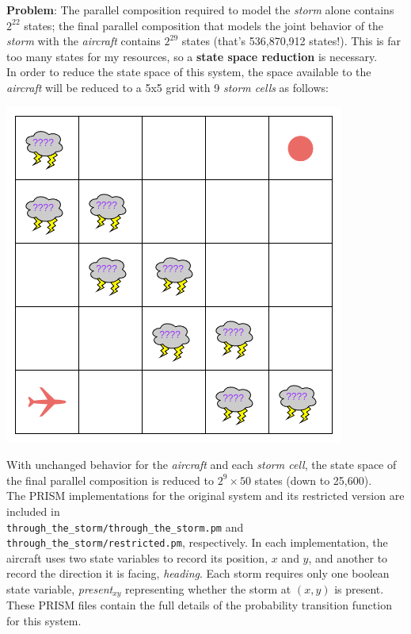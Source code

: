 \documentclass{article}
\begin{document}
\textbf{Problem}:
The parallel composition required to model the \textit{storm} alone contains $2^{22}$ states; the final parallel composition that models the joint behavior of the \textit{storm} with the \textit{aircraft} contains $2^{29}$ states (that's 536,870,912 states!). This is far too many states for my resources, so a \textbf{state space reduction} is necessary. \\

In order to reduce the state space of this system, the space available to the \textit{aircraft} will be reduced to a 5x5 grid with 9 \textit{storm cells} as follows:

\begin{center}
   \includegraphics[scale=.4]{figs/restricted.png} 
\end{center}

With unchanged behavior for the \textit{aircraft} and each \textit{storm cell}, the state space of the final parallel composition is reduced to $2^9\times50$ states (down to 25,600). \\

The PRISM implementations for the original system and its restricted version are included in \\\texttt{through\_the\_storm/through\_the\_storm.pm} and \texttt{through\_the\_storm/restricted.pm}, respectively. In each implementation, the aircraft uses two state variables to record its position, $x$ and $y$, and another to record the direction it is facing, \textit{heading}. Each storm requires only one boolean state variable, \textit{present}$_{xy}$ representing whether the storm at $(x,y)$ is present. These PRISM files contain the full details of the probability transition function for this system.
\end{document}
